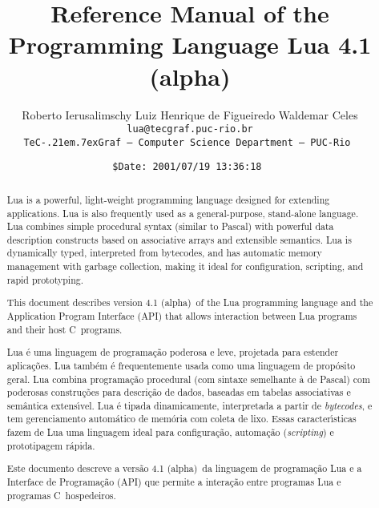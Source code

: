 \documentclass[11pt]{article}
\def\tecgraf{{\sf TeC\kern-.21em\lower.7ex\hbox{Graf}}}
\newcommand{\Version}{4.1 (alpha)}
\begin{document}
\title{\Large\bf Reference Manual of the Programming Language Lua \Version}

\author{%
Roberto Ierusalimschy\quad
Luiz Henrique de Figueiredo\quad
Waldemar Celes
\vspace{1.0ex}\\
\smallskip
\small\tt lua@tecgraf.puc-rio.br
\vspace{2.0ex}\\
\tecgraf\ --- Computer Science Department --- PUC-Rio
}

\date{{\small \tt\$Date: 2001/07/19 13:36:18 $ $}}

\maketitle

\pagestyle{plain}

\begin{abstract}
\noindent
Lua is a powerful, light-weight programming language
designed for extending applications.
Lua is also frequently used as a general-purpose, stand-alone language.
Lua combines simple procedural syntax
(similar to Pascal)
with
powerful data description constructs
based on associative arrays and extensible semantics.
Lua is
dynamically typed,
interpreted from bytecodes,
and has automatic memory management with garbage collection,
making it ideal for
configuration,
scripting,
and
rapid prototyping.

This document describes version \Version\ of the Lua programming language
and the Application Program Interface (API)
that allows interaction between Lua programs and their host C~programs.
\end{abstract}

\def\abstractname{Resumo}
\begin{abstract}
\noindent
Lua \'e uma linguagem de programa\c{c}\~ao
poderosa e leve,
projetada para estender aplica\c{c}\~oes.
Lua tamb\'em \'e frequentemente usada como uma linguagem de prop\'osito geral.
Lua combina programa\c{c}\~ao procedural
(com sintaxe semelhante \`a de Pascal)
com
poderosas constru\c{c}\~oes para descri\c{c}\~ao de dados,
baseadas em tabelas associativas e sem\^antica extens\'\i vel.
Lua \'e
tipada dinamicamente,
interpretada a partir de \emph{bytecodes},
e tem gerenciamento autom\'atico de mem\'oria com coleta de lixo.
Essas caracter\'{\i}sticas fazem de Lua uma linguagem ideal para
configura\c{c}\~ao,
automa\c{c}\~ao (\emph{scripting})
e prototipagem r\'apida.

Este documento descreve a vers\~ao \Version\ da linguagem de
programa\c{c}\~ao Lua e a Interface de Programa\c{c}\~ao (API) que permite
a intera\c{c}\~ao entre programas Lua e programas C~hospedeiros.
\end{abstract}
\end{document}
